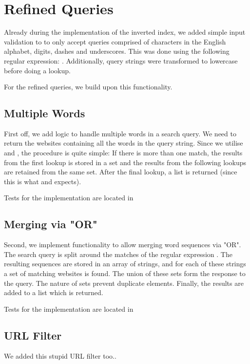 \section{Refined Queries}

Already during the implementation of the inverted index, we added simple input validation to  to only accept queries comprised of characters in the English alphabet, digits, dashes and underscores. This was done using the following regular expression: \code{\\\\b([-\\\\w]+)\\\\b}. Additionally, query strings were transformed to lowercase before doing a lookup.

For the refined queries, we build upon this functionality.

\subsection{Multiple Words}
First off, we add logic to handle multiple words in a search query. We need to return the websites containing all the words in the query string. Since we utilise  and , the procedure is quite simple: If there is more than one match, the results from the first lookup is stored in a set and the results from the following lookups are retained from the same set. After the final lookup, a list is returned (since this is what  and  expects).

Tests for the implementation are located in 

\subsection{Merging via "OR"}
Second, we implement functionality to allow merging word sequences via "OR". The search query is split around the matches of the regular expression \code{\\\\bOR\\\\b}. The resulting sequences are stored in an array of strings, and for each of these strings a set of matching websites is found. The union of these sets form the response to the query. The nature of sets prevent duplicate elements. Finally, the results are added to a list which is returned.

Tests for the implementation are located in 

\subsection{URL Filter}
We added this stupid URL filter too..